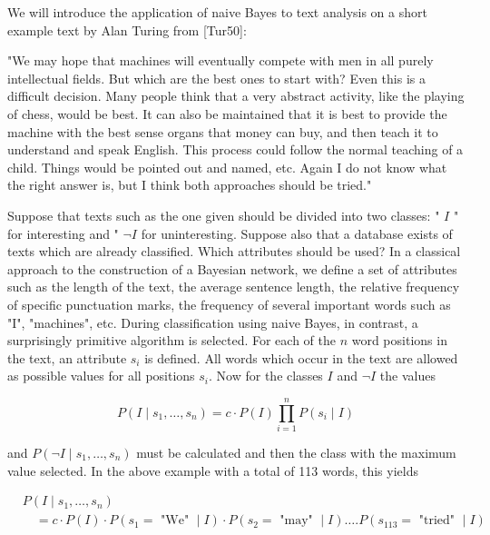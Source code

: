 \documentclass[10pt]{article}
\begin{document}
We will introduce the application of naive Bayes to text analysis on a short example text by Alan Turing from [Tur50]:

\begin{displayquote}
"We may hope that machines will eventually compete with men in all purely intellectual fields. But which are the best ones to start with? Even this is a difficult decision. Many people think that a very abstract activity, like the playing of chess, would be best. It can also be maintained that it is best to provide the machine with the best sense organs that money can buy, and then teach it to understand and speak English. This process could follow the normal teaching of a child. Things would be pointed out and named, etc. Again I do not know what the right answer is, but I think both approaches should be tried."
\end{displayquote}

Suppose that texts such as the one given should be divided into two classes: " $I$ " for interesting and " $\neg I$ for uninteresting. Suppose also that a database exists of texts which are already classified. Which attributes should be used? In a classical approach to the construction of a Bayesian network, we define a set of attributes such as the length of the text, the average sentence length, the relative frequency of specific punctuation marks, the frequency of several important words such as "I", "machines", etc. During classification using naive Bayes, in contrast, a surprisingly primitive algorithm is selected. For each of the $n$ word positions in the text, an attribute $s_{i}$ is defined. All words which occur in the text are allowed as possible values for all positions $s_{i}$. Now for the classes $I$ and $\neg I$ the values


\begin{equation*}
P\left(I \mid s_{1}, \ldots, s_{n}\right)=c \cdot P(I) \prod_{i=1}^{n} P\left(s_{i} \mid I\right) \tag{8.9}
\end{equation*}


and $P\left(\neg I \mid s_{1}, \ldots, s_{n}\right)$ must be calculated and then the class with the maximum value selected. In the above example with a total of 113 words, this yields

$$
\begin{aligned}
& P\left(I \mid s_{1}, \ldots, s_{n}\right) \\
& \quad=c \cdot P(I) \cdot P\left(s_{1}=\text { "We" } \mid I\right) \cdot P\left(s_{2}=\text { "may" } \mid I\right) \ldots . P\left(s_{113}=\text { "tried" } \mid I\right)
\end{aligned}
$$
\end{document}
